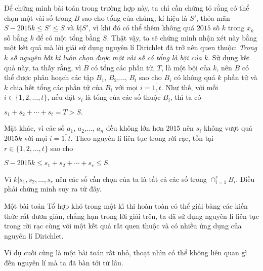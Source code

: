 \begin{vd}
{		Để chứng minh bài toán trong trường hợp này, ta chỉ cần chứng tỏ rằng có thể chọn một vài số trong $B$ sao cho tổng của chúng, kí hiệu là $S'$, thỏa mãn $S-2015k\leq S'\leq S$ và $k|S'$, vì khi đó có thể thêm không quá $2015$ số $k$ trong $x_k$ số bằng $k$ để có một tổng bằng $S$.
		Thật vậy, ta sẽ chứng minh nhận xét này bằng một kết quả mà lời giải sử dụng nguyên lí Dirichlet đã trở nên quen thuộc: \textit{Trong $k$ số nguyên bất kì luôn chọn được một vài số có tổng là bội của $k$}. Sử dụng kết quả này, ta thấy rằng, vì $B$ có tổng các phần từ, $T$, là một bội của $k$, nên $B$ có thể được phân hoạch các tập $B_1$, $B_2$,$\ldots$, $B_t$ sao cho $B_i$ có không quá $k$ phần tử và $k$ chia hết tổng các phần tử của $B_i$ với mọi $i=\overline{1,t}$. Như thế, với mỗi $i\in\{1,2,\ldots,t\}$, nếu đặt $s_i$ là tổng của các số thuộc $B_i$, thì ta có
		\begin{center}
			$s_1+s_2+\cdots+s_t=T>S.$
		\end{center}
		Mặt khác, vì các số $a_1$, $a_2$,$\ldots$, $a_n$ đều không lớn hơn $2015$ nên $s_i$ không vượt quá $2015k$ với mọi $i=\overline{1,t}$. Theo nguyên lí liên tục trong rời rạc, tồn tại $r\in\{1,2,\ldots,t\}$ sao cho
		\begin{center}
			$S-2015k\leq s_1+s_2+\cdots+s_r\leq S.$
		\end{center}
		Vì $k|s_1,s_2,\ldots,s_r$ nên các số cần chọn của ta là tất cả các số trong $\displaystyle\cap_{i=1}^r B_i$. Điều phải chứng minh suy ra từ đây.
	}
\end{vd}
\begin{nx}
	Một bài toán Tổ hợp khó trong một kì thi hoàn toàn có thể giải bàng các kiến thức rất đươn giản, chẳng hạn trong lời giải trên, ta đã sử dụng nguyên lí liên tục trong rời rạc cùng với một kết quả rất quen thuộc và có nhiều ứng dụng của nguyên lí Dirichlet.
\end{nx}
Ví dụ cuối cùng là một bài toán rất nhỏ, thoạt nhìn có thể không liên quan gì đến nguyên lí mà ta đã bàn tới từ lâu.
